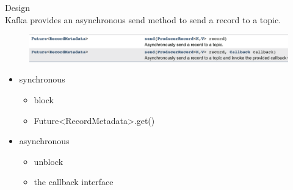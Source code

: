 \begin{frame}[plain,t]{Design} %
     \\
    \vspace{2ex}
    Kafka provides an asynchronous send method to send a record to a topic.
    
    \begin{figure}
        \centering
        \includegraphics[width=0.9\linewidth]{image/0204}
        \label{fig:0204}
    \end{figure}
    
    
    \begin{itemize}
        \item synchronous
        \begin{itemize}
            \item block
            \item Future<RecordMetadata>.get()
        \end{itemize}
        \item asynchronous
        \begin{itemize}
            \item unblock
            \item the callback interface
        \end{itemize}
    \end{itemize}




    
    
\end{frame}

